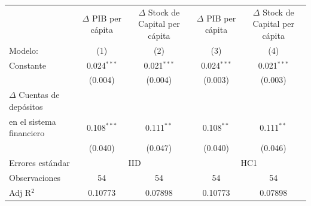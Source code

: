 \begingroup
\centering
\begin{tabular}{lcccc}
   \tabularnewline \midrule \midrule
                                             & $\Delta$ PIB per cápita  & \makecell{$\Delta$ Stock de Capital \\per cápita}     & $\Delta$ PIB per cápita  & \makecell{$\Delta$ Stock de Capital \\per cápita}\\      
   Modelo:                                                       & (1)                      & (2)                                                   & (3)                      & (4)\\  
   \midrule
 
   Constante                                                     & 0.024$^{***}$            & 0.021$^{***}$                                         & 0.024$^{***}$            & 0.021$^{***}$\\   
                                                                & (0.004)                  & (0.004)                                               & (0.003)                  & (0.003)\\   
   $\Delta$ Cuentas de depósitos \\ en el sistema financiero    & 0.108$^{***}$            & 0.111$^{**}$                                          & 0.108$^{**}$             & 0.111$^{**}$\\   
                                                                & (0.040)                  & (0.047)                                               & (0.040)                  & (0.046)\\   
   \midrule
   Errores estándar & \multicolumn{2}{c}{IID} & \multicolumn{2}{c}{HC1} \\ 
   Observaciones                                                 & 54                       & 54                                                    & 54                       & 54\\  
   Adj R$^2$                                               & 0.10773                  & 0.07898                                               & 0.10773                  & 0.07898\\  
   \midrule \midrule
\end{tabular}
\par\endgroup

